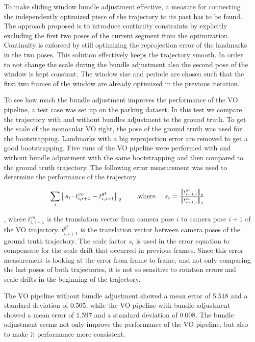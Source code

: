 \documentclass{article}
\begin{document}
To make sliding window bundle adjustment effective, a measure for connecting the independently optimized piece of the trajectory to its past has to be found.
%
The approach proposed is to introduce continuity constraints by explicitly excluding the first two poses of the current segment from the optimization.
%
Continuity is  enforced by still optimizing the reprojection error of the landmarks in the two poses.
%
This solution effectively keeps the trajectory smooth.
%
In order to not change the scale during the bundle adjustment also the second pose of the window is kept constant.
%
The window size and periode are chosen such that the first two frames of the window are already optimized in the previous iteration.


To see how much the bundle adjustment improves the performance of the VO pipeline, a test case was set up on the parking dataset.
%
In this test we compare the trajectory with and without bundles adjustment to the ground truth.
%
To get the scale of the monocular VO right, the pose of the ground truth was used for the bootstrapping.
%
Landmarks with a big reprojection error are removed to get a good bootstrapping.
%
Five runs of the VO pipeline were performed with and without bundle adjustment with the same bootstrapping and then compared to the ground truth trajectory.
%
The following error measurement was used to determine the performance of the trajectory

\newcommand{\norm}[1]{\left\lVert#1\right\rVert_2}
$$\sum_i \norm{s_i \cdot t_{i,i+1}^{vo} - t_{i,i+1}^{gt}} \text{\qquad ,where \quad} s_i = \tfrac{\norm{t_{i-1,i}^{gt}}}{\norm{t_{i-1,i}^{vo}}} $$

, where $t_{i,i+1}^{vo}$ is the translation vector from camera pose $i$ to camera pose $i+1$ of the VO trajectory.
%
$t_{i,i+1}^{gt}$ is the translation vector between camera poses of the ground truth trajectory.
%
The scale factor $s_i$ is used in the error equation to compensate for the scale drift that occurred in previous frames.
%
Since this error measurement is looking at the error from frame to frame, and not only comparing the last poses of both trajectories, it is not so sensitive to rotation errors and scale drifts in the beginning of the trajectory.

The VO pipeline without bundle adjustment showed a mean error of 5.548 and a standard deviation of 0.505, while the VO pipeline with bundle adjustment showed a mean error of 1.597 and a standard deviation of 0.008.
%
The bundle adjustment seems not only improve the performance of the VO pipeline, but also to make it performance more consistent.
\end{document}
